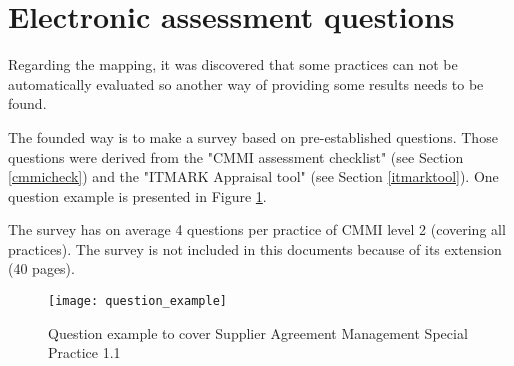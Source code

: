 







\section{Electronic assessment questions} \label{sec:question}

Regarding the mapping, it was discovered  that some practices can not be automatically evaluated so another way of providing some results needs to be found.

The founded way is to make a survey based on pre-established questions. Those questions were derived from the "CMMI assessment checklist" (see Section \ref{cmmicheck}) and  the "ITMARK Appraisal tool" (see Section \ref{itmarktool}). One question example is presented in Figure \ref{fig:question_example}.


The survey has on average 4 questions per practice of CMMI level 2 (covering all practices). The survey is not included in this documents because of its extension (40 pages).

\begin{figure}[!htb]
	\begin{center}
		\leavevmode
		\texttt{[image: question\_example]}
		\caption{Question example to cover Supplier Agreement Management Special Practice 1.1}
		\label{fig:question_example}
	\end{center}
\end{figure}

